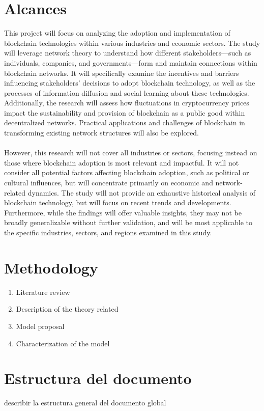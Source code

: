 \section{Alcances}

This project will focus on analyzing the adoption and implementation of blockchain technologies within various industries and economic sectors. The study will leverage network theory to understand how different stakeholders—such as individuals, companies, and governments—form and maintain connections within blockchain networks. It will specifically examine the incentives and barriers influencing stakeholders’ decisions to adopt blockchain technology, as well as the processes of information diffusion and social learning about these technologies. Additionally, the research will assess how fluctuations in cryptocurrency prices impact the sustainability and provision of blockchain as a public good within decentralized networks. Practical applications and challenges of blockchain in transforming existing network structures will also be explored.
\\
\\
However, this research will not cover all industries or sectors, focusing instead on those where blockchain adoption is most relevant and impactful. It will not consider all potential factors affecting blockchain adoption, such as political or cultural influences, but will concentrate primarily on economic and network-related dynamics. The study will not provide an exhaustive historical analysis of blockchain technology, but will focus on recent trends and developments. Furthermore, while the findings will offer valuable insights, they may not be broadly generalizable without further validation, and will be most applicable to the specific industries, sectors, and regions examined in this study.



\section{Methodology}


\begin{enumerate}
\item Literature review
\item Description of the theory related
\item Model proposal
\item Characterization of the model
\end{enumerate}

\newpage
\section{Estructura del documento}

describir la estructura general del documento global



